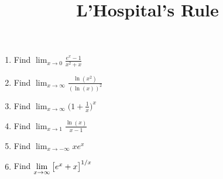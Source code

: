 \documentclass[12pt]{article}
\title{L'Hospital's Rule}
\theoremstyle{remark}
\begin{document}
\maketitle
\begin{enumerate}
\item Find $\displaystyle{ \lim_{x \rightarrow 0} \frac{e^x-1}{x^2+x} }$
\vspace{4cm}
\item Find $\displaystyle{ \lim_{x \rightarrow \infty} \frac{\ln(x^2)}{(\ln(x))^2} }$
\vspace{4cm}
\item Find $\displaystyle{ \lim_{x \rightarrow \infty} \bigg(1+\frac{1}{x}\bigg)^x}$
\vspace{4cm}
\newpage
\item Find $\displaystyle{ \lim_{x \rightarrow 1} \frac{\ln(x)}{x-1}}$
\vspace{4cm}
\item Find $\displaystyle{ \lim_{x \rightarrow -\infty} xe^x}$
\vspace{4cm}
\item Find $\displaystyle{ \lim_{x \rightarrow \infty} \big{[e^x+x \big]}^{1/x}}$
\vspace{4cm}
\end{enumerate}
\end{document}
